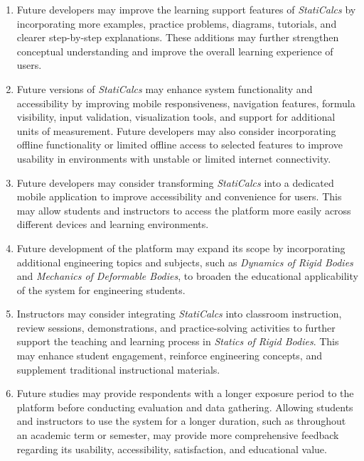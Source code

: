 \begin{enumerate}

\item Future developers may improve the learning support features of \textit{StatiCalcs} by incorporating more examples, practice problems, diagrams, tutorials, and clearer step-by-step explanations. These additions may further strengthen conceptual understanding and improve the overall learning experience of users.

\item Future versions of \textit{StatiCalcs} may enhance system functionality and accessibility by improving mobile responsiveness, navigation features, formula visibility, input validation, visualization tools, and support for additional units of measurement. Future developers may also consider incorporating offline functionality or limited offline access to selected features to improve usability in environments with unstable or limited internet connectivity.

\item Future developers may consider transforming \textit{StatiCalcs} into a dedicated mobile application to improve accessibility and convenience for users. This may allow students and instructors to access the platform more easily across different devices and learning environments.

\item Future development of the platform may expand its scope by incorporating additional engineering topics and subjects, such as \textit{Dynamics of Rigid Bodies} and \textit{Mechanics of Deformable Bodies}, to broaden the educational applicability of the system for engineering students.

\item Instructors may consider integrating \textit{StatiCalcs} into classroom instruction, review sessions, demonstrations, and practice-solving activities to further support the teaching and learning process in \textit{Statics of Rigid Bodies}. This may enhance student engagement, reinforce engineering concepts, and supplement traditional instructional materials.

\item Future studies may provide respondents with a longer exposure period to the platform before conducting evaluation and data gathering. Allowing students and instructors to use the system for a longer duration, such as throughout an academic term or semester, may provide more comprehensive feedback regarding its usability, accessibility, satisfaction, and educational value.


\end{enumerate}
